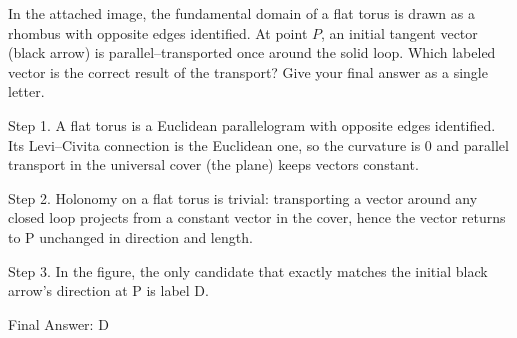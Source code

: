 In the attached image, the fundamental domain of a flat torus is drawn as a rhombus with opposite edges identified. At point $P$, an initial tangent vector (black arrow) is parallel–transported once around the solid loop.  Which labeled vector is the correct result of the transport? Give your final answer as a single letter.

Step 1. A flat torus is a Euclidean parallelogram with opposite edges identified. Its Levi–Civita connection is the Euclidean one, so the curvature is 0 and parallel transport in the universal cover (the plane) keeps vectors constant.

Step 2. Holonomy on a flat torus is trivial: transporting a vector around any closed loop projects from a constant vector in the cover, hence the vector returns to P unchanged in direction and length.

Step 3. In the figure, the only candidate that exactly matches the initial black arrow’s direction at P is label D.

Final Answer: D